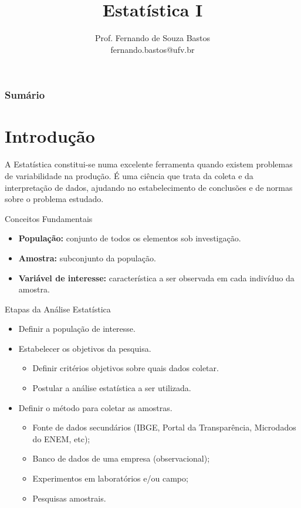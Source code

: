 \documentclass[14pt,aspectratio=1610]{beamer}
\title{Estatística I}
\author{Prof. Fernando de Souza Bastos \texorpdfstring{\\ fernando.bastos@ufv.br}{}}
\institute{Departamento de Estatística \texorpdfstring{\\ Universidade Federal de Viçosa}{}\texorpdfstring{\\ Campus UFV - Viçosa}{}}
\date{}
\begin{document}
%

\frame{\titlepage}

\begin{frame}{}
\frametitle{\bf Sumário}
\tableofcontents
\end{frame}

\section{Introdução}
\begin{frame}{}
    \begin{block}{}
    \justifying
A Estatística constitui-se numa excelente ferramenta quando existem problemas de variabilidade na produção. É uma ciência que trata da coleta e da interpretação de dados, ajudando no estabelecimento de conclusões e de normas sobre o problema estudado.
    \end{block}
\end{frame}

\begin{frame}{Conceitos Fundamentais}
    \begin{block}{}
    \justifying
\begin{itemize}[label={}]
\item \textbf{População:} conjunto de todos os elementos sob investigação.
\item \textbf{Amostra:} subconjunto da população.
\item \textbf{Variável de interesse:} característica a ser observada em cada indivíduo da amostra.
\end{itemize}
    \end{block}
\end{frame}

\begin{frame}{Etapas da Análise Estatística}
    \begin{block}{}
    \justifying
\begin{itemize}[label={}]
\item Definir a população de interesse.\pause
\item Estabelecer os objetivos da pesquisa.\pause
\begin{itemize}[label={}]
\item Definir critérios objetivos sobre quais dados coletar.\pause
\item Postular a análise estatística a ser utilizada.\pause
\end{itemize}
\item Definir o método para coletar as amostras.\pause
\begin{itemize}[label={}]
\item Fonte de dados secundários (IBGE, Portal da Transparência, Microdados do ENEM, etc);\pause
\item Banco de dados de uma empresa (observacional);\pause
\item Experimentos em laboratórios e/ou campo;\pause
\item Pesquisas amostrais.
\end{itemize}
\end{itemize}
    \end{block}
\end{frame}
\end{document}

